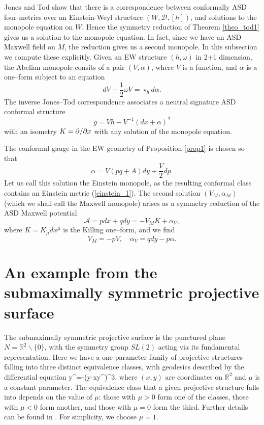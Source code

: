 Jones and Tod \cite{JT} show that there is a correspondence between conformally ASD four-metrics over an Einstein-Weyl structure $(W,\mathcal{D},[h])$, and solutions to the monopole equation on $W$. Hence the symmetry reduction of Theorem
\ref{theo_tod1} gives us a solution to the monopole equation. In fact, since we have an ASD Maxwell field on $M$, the reduction gives us a second monopole. In this subsection we compute these explicitly.
Given an EW structure $(h, \omega)$ in 2+1 dimension, the Abelian monopole consits
of a pair $(V, \alpha)$, where $V$ is a function, and $\alpha$ is a one--form subject to an equation
\[
dV+\frac{1}{2}\omega V=\star_h d\alpha.
\]
The inverse Jones--Tod correspondence \cite{JT} associates a neutral signature 
ASD conformal structure
\[
g=Vh-V^{-1}(dx +\alpha)^2
\]
with an isometry $K=\partial/\partial x$ with any solution of the monopole equation.


The conformal gauge in the EW geometry of Proposition \ref{prop1} 
is chosen so that 
\[
\alpha=V( pq+A)dy+\frac{V}{2}dp.
\]
Let us call this solution the Einstein monopole, as the resulting conformal class contains an Einstein metric
(\ref{einstein_1}). The second solution $(V_M, \alpha_M)$ (which we shall call the Maxwell monopole)
arises
as a symmetry reduction of the ASD Maxwell potential
\[
{\mathcal A}=pdx+qdy=-V_M K+\alpha_V,
\]
where $K=K_{\mu}dx^{\mu}$ is the Killing one--form, and
we find
\[
V_M=-pV, \quad \alpha_V=qdy-p\alpha.
\]
\section{An example from the submaximally symmetric projective surface}
\label{neat}
The submaximally symmetric projective surface is the punctured plane $N=\mathbb{R}^2\backslash\{0\}$, with the symmetry group $SL(2)$ acting via its fundamental representation. Here we have a one parameter family of projective structures falling into three distinct equivalence classes, with geodesics described by the differential equation
\be
\label{neatODE}
y^{\prime \prime}=-\mu(y-xy^\prime)^3,
\ee
where $(x,y)$ are coordinates on $\mathbb{R} ^2$ and $\mu$ is a constant parameter. The equivalence class that a given projective structure falls into depends on the value of $\mu$: those with $\mu>0$ form one of the classes, those with $\mu<0$ form another, and those with $\mu=0$ form the third. Further details can be found in \cite{Bryant}. For simplicity, we choose $\mu=1$.

